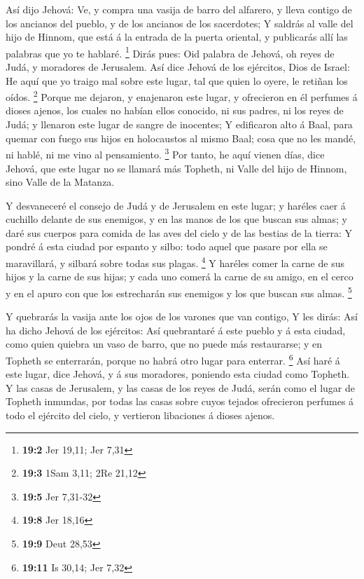  Así dijo Jehová: Ve, y compra una vasija de barro del
alfarero, y lleva contigo de los ancianos del pueblo, y de los ancianos
de los sacerdotes;  Y saldrás al valle del hijo de Hinnom,
que está á la entrada de la puerta oriental, y publicarás allí las
palabras que yo te hablaré. \footnote{\textbf{19:2} Jer 19,11; Jer 7,31}
 Dirás pues: Oid palabra de Jehová, oh reyes de Judá, y
moradores de Jerusalem. Así dice Jehová de los ejércitos, Dios de
Israel: He aquí que yo traigo mal sobre este lugar, tal que quien lo
oyere, le retiñan los oídos. \footnote{\textbf{19:3} 1Sam 3,11; 2Re
  21,12}  Porque me dejaron, y enajenaron este lugar, y
ofrecieron en él perfumes á dioses ajenos, los cuales no habían ellos
conocido, ni sus padres, ni los reyes de Judá; y llenaron este lugar de
sangre de inocentes;  Y edificaron alto á Baal, para quemar
con fuego sus hijos en holocaustos al mismo Baal; cosa que no les mandé,
ni hablé, ni me vino al pensamiento. \footnote{\textbf{19:5} Jer 7,31-32}
 Por tanto, he aquí vienen días, dice Jehová, que este lugar
no se llamará más Topheth, ni Valle del hijo de Hinnom, sino Valle de la
Matanza.

 Y desvaneceré el consejo de Judá y de Jerusalem en este
lugar; y haréles caer á cuchillo delante de sus enemigos, y en las manos
de los que buscan sus almas; y daré sus cuerpos para comida de las aves
del cielo y de las bestias de la tierra:  Y pondré á esta
ciudad por espanto y silbo: todo aquel que pasare por ella se
maravillará, y silbará sobre todas sus plagas. \footnote{\textbf{19:8}
  Jer 18,16}  Y haréles comer la carne de sus hijos y la
carne de sus hijas; y cada uno comerá la carne de su amigo, en el cerco
y en el apuro con que los estrecharán sus enemigos y los que buscan sus
almas. \footnote{\textbf{19:9} Deut 28,53}

 Y quebrarás la vasija ante los ojos de los varones que van
contigo,  Y les dirás: Así ha dicho Jehová de los
ejércitos: Así quebrantaré á este pueblo y á esta ciudad, como quien
quiebra un vaso de barro, que no puede más restaurarse; y en Topheth se
enterrarán, porque no habrá otro lugar para enterrar. \footnote{\textbf{19:11}
  Is 30,14; Jer 7,32}  Así haré á este lugar, dice Jehová,
y á sus moradores, poniendo esta ciudad como Topheth.  Y
las casas de Jerusalem, y las casas de los reyes de Judá, serán como el
lugar de Topheth inmundas, por todas las casas sobre cuyos tejados
ofrecieron perfumes á todo el ejército del cielo, y vertieron libaciones
á dioses ajenos.

